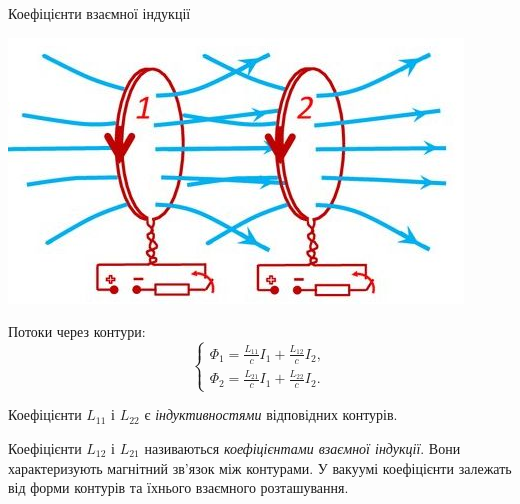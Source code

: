 \documentclass{beamer}
\begin{document}
\begin{frame}{Коефіцієнти взаємної індукції}{}
	\begin{center}
		\includegraphics[width=0.5\linewidth]{interinduction}
	\end{center}

    Потоки через контури:
    \begin{equation*}
    \begin{cases}
        \Phi_1  = \frac{L_{11}}{c} I_1 + \frac{L_{12}}{c} I_2, \\[1ex]
        \Phi_2  = \frac{L_{21}}{c} I_1 + \frac{L_{22}}{c} I_2.
    \end{cases}
    \end{equation*}

    Коефіцієнти $ L_{11} $ і $ L_{22} $ є \emph{індуктивностями} відповідних контурів.

    Коефіцієнти $ L_{12} $ і $ L_{21} $ називаються \emph{коефіцієнтами взаємної індукції}. Вони характеризують магнітний зв'язок між контурами. У вакуумі коефіцієнти залежать від форми контурів та їхнього взаємного розташування.

\end{frame}
\end{document}
